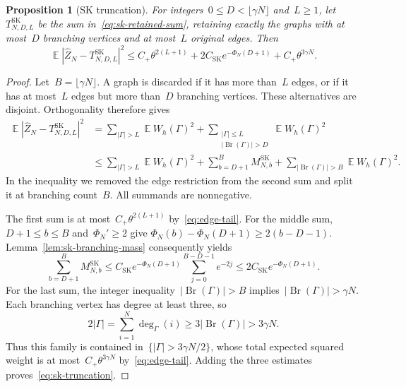 \documentclass[letterpaper,11pt,reqno]{amsart}
\renewcommand{\leq}{\leqslant}
\renewcommand{\geq}{\geqslant}
\DeclareMathOperator{\E}{\mathds{E}}
\DeclareMathOperator{\Br}{Br}
\newtheorem{proposition}[theorem]{Proposition}
\begin{document}
\begin{proposition}[SK truncation]\label{prop:sk-truncation}
For integers~$0\leq D<\lfloor\gamma N\rfloor$ and~$L\geq1$, let~$T^{\mathrm{SK}}_{N,D,L}$ be the sum in~\eqref{eq:sk-retained-sum}, retaining exactly the graphs with at most~$D$ branching vertices and at most~$L$ original edges. Then
\begin{equation}\label{eq:sk-truncation}
\E|\widehat Z_N-T^{\mathrm{SK}}_{N,D,L}|^2
\leq C_+\theta^{2(L+1)}+2C_{\mathrm{SK}}e^{-\Phi_N(D+1)}+C_+\theta^{3\gamma N}.
\end{equation}
\end{proposition}
\begin{proof}
Let~$B=\lfloor\gamma N\rfloor$. A graph is discarded if it has more than~$L$ edges, or if it has at most~$L$ edges but more than~$D$ branching vertices. These alternatives are disjoint. Orthogonality therefore gives
\begin{align*}
\E|\widehat Z_N-T^{\mathrm{SK}}_{N,D,L}|^2
&=\sum_{|\Gamma|>L}\E W_h(\Gamma)^2
 +\sum_{\substack{|\Gamma|\leq L\\|\Br(\Gamma)|>D}}\E W_h(\Gamma)^2\\
&\leq\sum_{|\Gamma|>L}\E W_h(\Gamma)^2
 +\sum_{b=D+1}^{B}M^{\mathrm{SK}}_{N,b}
 +\sum_{|\Br(\Gamma)|>B}\E W_h(\Gamma)^2.
\end{align*}
In the inequality we removed the edge restriction from the second sum and split it at branching count~$B$. All summands are nonnegative.

The first sum is at most~$C_+\theta^{2(L+1)}$ by~\eqref{eq:edge-tail}. For the middle sum, $D+1\leq b\leq B$ and~$\Phi_N'\geq2$ give
$\Phi_N(b)-\Phi_N(D+1)\geq2(b-D-1)$. Lemma~\ref{lem:sk-branching-mass} consequently yields
\begin{equation*}
\sum_{b=D+1}^{B}M^{\mathrm{SK}}_{N,b}
\leq C_{\mathrm{SK}}e^{-\Phi_N(D+1)}\sum_{j=0}^{B-D-1}e^{-2j}
\leq2C_{\mathrm{SK}}e^{-\Phi_N(D+1)}.
\end{equation*}
For the last sum, the integer inequality~$|\Br(\Gamma)|>B$ implies~$|\Br(\Gamma)|>\gamma N$. Each branching vertex has degree at least three, so
\begin{equation*}
2|\Gamma|=\sum_{i=1}^N\deg_\Gamma(i)
\geq3|\Br(\Gamma)|>3\gamma N.
\end{equation*}
Thus this family is contained in~$\{|\Gamma|>3\gamma N/2\}$, whose total expected squared weight is at most~$C_+\theta^{3\gamma N}$ by~\eqref{eq:edge-tail}. Adding the three estimates proves~\eqref{eq:sk-truncation}.
\end{proof}
\end{document}
